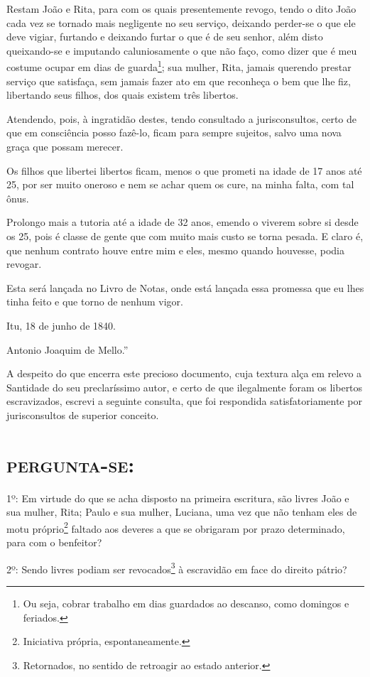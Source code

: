 Restam João e Rita, para com os quais presentemente revogo, tendo o dito
João cada vez se tornado mais negligente no seu serviço, deixando
perder-se o que ele deve vigiar, furtando e deixando furtar o que é de
seu senhor, além disto queixando-se e imputando caluniosamente o que não
faço, como dizer que é meu costume ocupar em dias de guarda\footnote{
  Ou seja, cobrar trabalho em dias guardados ao descanso, como domingos
  e feriados.}; sua mulher, Rita, jamais querendo prestar serviço que
satisfaça, sem jamais fazer ato em que reconheça o bem que lhe fiz,
libertando seus filhos, dos quais existem três libertos.

Atendendo, pois, à ingratidão destes, tendo consultado a jurisconsultos,
certo de que em consciência posso fazê-lo, ficam para sempre sujeitos,
salvo uma nova graça que possam merecer.

Os filhos que libertei libertos ficam, menos o que prometi na idade de
17 anos até 25, por ser muito oneroso e nem se achar quem os cure, na
minha falta, com tal ônus.

Prolongo mais a tutoria até a idade de 32 anos, emendo o viverem sobre
si desde os 25, pois é classe de gente que com muito mais custo se torna
pesada. E claro é, que nenhum contrato houve entre mim e eles, mesmo
quando houvesse, podia revogar.

Esta será lançada no Livro de Notas, onde está lançada essa promessa que
eu lhes tinha feito e que torno de nenhum vigor.

Itu, 18 de junho de 1840.

Antonio Joaquim de Mello.''

A despeito do que encerra este precioso documento, cuja textura alça em
relevo a Santidade do seu preclaríssimo autor, e certo de que
ilegalmente foram os libertos escravizados, escrevi a seguinte consulta,
que foi respondida satisfatoriamente por jurisconsultos de superior
conceito.

\section{\textsc{pergunta-se}:}

1º: Em virtude do que se acha disposto na primeira escritura, são livres
João e sua mulher, Rita; Paulo e sua mulher, Luciana, uma vez que não
tenham eles de motu próprio\footnote{Iniciativa própria,
  espontaneamente.} faltado aos deveres a que se obrigaram por prazo
determinado, para com o benfeitor?

2º: Sendo livres podiam ser revocados\footnote{Retornados, no sentido
  de retroagir ao estado anterior.} à escravidão em face do direito
pátrio?

